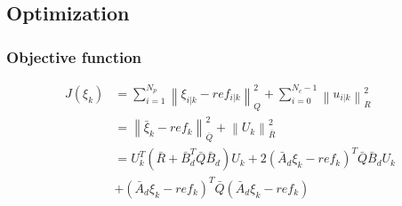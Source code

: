 \documentclass[12pt]{article}
\begin{document}
                
                
    \subsection{Optimization}


        \subsubsection{Objective function}
            \begin{equation}
                \begin{aligned}
                    J(\xi_k)    & = \sum_{i = 1}^{N_p} \left\lVert \xi_{i|k} - ref_{i|k} \right\rVert^{2}_{Q} + \sum_{i = 0}^{N_c-1} \left\lVert u_{i|k} \right\rVert^{2}_{R} \\
                                & = \left\lVert \bar{\xi}_{k} - ref_{k} \right\rVert^{2}_{\bar{Q}} + \left\lVert U_{k} \right\rVert^{2}_{\bar{R}} \\
                                & = U_k^T \left( \bar{R} + \bar{B}_d^T \bar{Q} \bar{B}_d \right) U_k 
                                    + 2 \left( \bar{A}_d \xi_{k} - ref_{k} \right)^T \bar{Q} \bar{B}_d U_k \\
                                & + \left( \bar{A}_d \xi_{k} - ref_{k} \right)^T \bar{Q} \left( \bar{A}_d \xi_k - ref_{k} \right) \\
                \end{aligned}
            \end{equation}
\end{document}
